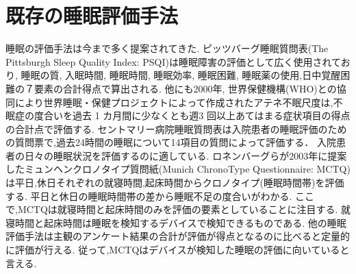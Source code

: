 \section{既存の睡眠評価手法}
睡眠の評価手法は今まで多く提案されてきた.
ピッツバーグ睡眠質問表(The Pittsburgh Sleep Quality Index: PSQI)\cite{PSQI}は睡眠障害の評価として広く使用されており, 睡眠の質, 入眠時間, 睡眠時間, 睡眠効率, 睡眠困難, 睡眠薬の使用,日中覚醒困難の７要素の合計得点で算出される. 
他にも2000年, 世界保健機構(WHO)との協同により世界睡眠・保健プロジェクトによって作成されたアテネ不眠尺度\cite{AIS}は,不眠症の度合いを過去 1 カ月間に少なくとも週3 回以上あてはまる症状項目の得点の合計点で評価する.
セントマリー病院睡眠質問表\cite{Stmary}は入院患者の睡眠評価のための質問票で,過去24時間の睡眠について14項目の質問によって評価する．
入院患者の日々の睡眠状況を評価するのに適している.
ロネンバーグらが2003年に提案したミュンヘンクロノタイプ質問紙(Munich ChronoType Questionnaire: MCTQ)\cite{MCTQ}は平日,休日それぞれの就寝時間,起床時間からクロノタイプ(睡眠時間帯)を評価する.
平日と休日の睡眠時間帯の差から睡眠不足の度合いがわかる.
ここで,MCTQは就寝時間と起床時間のみを評価の要素としていることに注目する.
就寝時間と起床時間は睡眠を検知するデバイスで検知できるものである.
他の睡眠評価手法は主観のアンケート結果の合計が評価が得点となるのに比べると定量的に評価が行える.
従って,MCTQはデバイスが検知した睡眠の評価に向いていると言える.

